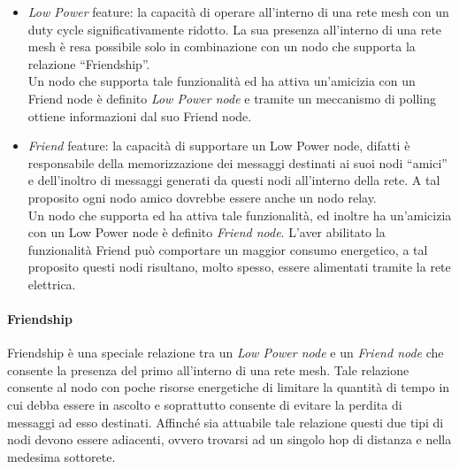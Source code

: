 \begin{itemize}
    \item \textit{Low Power} feature: la capacità di operare all'interno di una rete mesh con un duty cycle significativamente ridotto. La sua presenza all'interno di una rete mesh è resa possibile solo in combinazione con un nodo che supporta la relazione ``Friendship''.\\
    Un nodo che supporta tale funzionalità ed ha attiva un'amicizia con un Friend node è definito \textit{Low Power node} e tramite un meccanismo di polling ottiene informazioni dal suo Friend node.
    
    \item \textit{Friend} feature: la capacità di supportare un Low Power node, difatti è responsabile della memorizzazione dei messaggi destinati ai suoi nodi ``amici'' e dell'inoltro di messaggi generati da questi nodi all'interno della rete. A tal proposito ogni nodo amico dovrebbe essere anche un nodo relay.\\
    Un nodo che supporta ed ha attiva tale funzionalità, ed inoltre ha un'amicizia con un Low Power node è definito \textit{Friend node}. L'aver abilitato la funzionalità Friend può comportare un maggior consumo energetico, a tal proposito questi nodi risultano, molto spesso, essere alimentati tramite la rete elettrica.
\end{itemize}

\paragraph{Friendship}
Friendship è una speciale relazione tra un \textit{Low Power node} e un \textit{Friend node} che consente la presenza del primo all'interno di una rete mesh. Tale relazione consente al nodo con poche risorse energetiche di limitare la quantità di tempo in cui debba essere in ascolto e soprattutto consente di evitare la perdita di messaggi ad esso destinati. Affinché sia attuabile tale relazione questi due tipi di nodi devono essere adiacenti, ovvero trovarsi ad un singolo hop di distanza e nella medesima sottorete.\\

